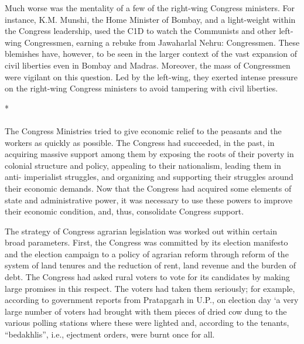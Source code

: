 Much worse was the mentality of a few of the right-wing Congress ministers. For instance, K.M. Munshi, the Home Minister of Bombay, and a light-weight within the Congress leadership, used the C1D to watch the Communists and other left-wing Congressmen, earning a rebuke from Jawaharlal Nehru: Congressmen. These blemishes have, however, to be seen in the larger context of the vast expansion of civil liberties even in Bombay and Madras. Moreover, the mass of Congressmen were vigilant on this question. Led by the left-wing, they exerted intense pressure on the right-wing Congress ministers to avoid tampering with civil liberties.

\begin{center}*\end{center}

\paragraph*{}


The Congress Ministries tried to give economic relief to the peasants and the workers as quickly as possible. The Congress had succeeded, in the past, in acquiring massive support among them by exposing the roots of their poverty in colonial structure and policy, appealing to their nationalism, leading them in anti- imperialist struggles, and organizing and supporting their struggles around their economic demands. Now that the Congress had acquired some elements of state and administrative power, it was necessary to use these powers to improve their economic condition, and, thus, consolidate Congress support. 

The strategy of Congress agrarian legislation was worked out within certain broad parameters. First, the Congress was committed by its election manifesto and the election campaign to a policy of agrarian reform through reform of the system of land tenures and the reduction of rent, land revenue and the burden of debt. The Congress had asked rural voters to vote for its candidates by making large promises in this respect. The voters had taken them seriously; for example, according to government reports from Pratapgarh in U.P., on election day `a very large number of voters had brought with them pieces of dried cow dung to the various polling stations where these were lighted and, according to the tenants, ``bedakhlis'', i.e., ejectment orders, were burnt once for all. 

